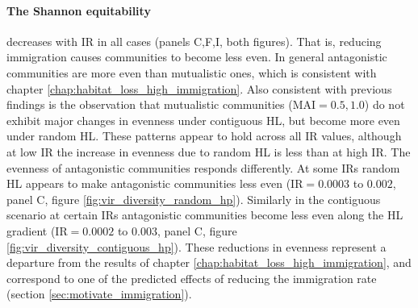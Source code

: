 \paragraph*{The Shannon equitability} decreases with IR in all cases (panels C,F,I, both figures). That is, reducing immigration causes communities to become less even. In general antagonistic communities are more even than mutualistic ones, which is consistent with chapter \ref{chap:habitat_loss_high_immigration}. Also consistent with previous findings is the observation that mutualistic communities (MAI$=0.5,1.0$) do not exhibit major changes in evenness under contiguous HL, but become more even under random HL. These patterns appear to hold across all IR values, although at low IR the increase in evenness due to random HL is less than at high IR. The evenness of antagonistic communities responds differently. At some IRs random HL appears to make antagonistic communities less even (IR$=0.0003$ to $0.002$, panel C, figure \ref{fig:vir_diversity_random_hp}). Similarly in the contiguous scenario at certain IRs antagonistic communities become less even along the HL gradient (IR$=0.0002$ to $0.003$, panel C, figure \ref{fig:vir_diversity_contiguous_hp}). These reductions in evenness represent a departure from the results of chapter \ref{chap:habitat_loss_high_immigration}, and correspond to one of the predicted effects of reducing the immigration rate (section \ref{sec:motivate_immigration}).
